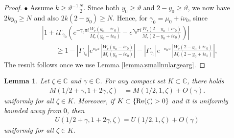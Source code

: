\documentclass[11pt,reqno]{amsproc}
\newcommand{\bullpar}[1]{\vspace{.5em}\noindent $\bullet$ \normalfont {\bfseries #1.}}
\newtheorem{lemma}[proposition]{Lemma}
\theoremstyle{definition}
\numberwithin{equation}{section}
\newcommand{\C}{{\mathbb C}}
\newcommand{\sr}{{\mathsf{r}}}
\newcommand{\ep}{\varepsilon}
\def\Re{{\rm Re}}
\begin{document}
\begin{proof}
\bullpar{Case 2} Assume $k\geq \vartheta^{-1}\frac{N}{2}$. Since both $y_0\geq \vartheta$ and $2-y_0\geq \vartheta$, we now have $2ky_0\geq N$ and also $2k(2-y_0)\geq N$. Hence, for $\gamma_0 = \mu_0 + i \nu_0$, since 
\begin{align*}
&\left| 1 + i\Gamma_{\gamma_0} \left( e^{-{\gamma_0}\pi i}\frac{W_{\sr}(y_0-i\ep_0)}{M_{\sr}(y_0-i\ep_0)} - e^{{\gamma_0} \pi i}\frac{W_{\sr}(2-y_0+i\ep_0)}{M_{\sr}(2-y_0+i\ep_0)} \right) \right| \\
&\qquad\geq 1 - |\Gamma_{\gamma_0}|e^{\nu_0\pi} \left|   \frac{W_{\sr}(y_0-i\ep_0)}{M_{\sr}(y_0-i\ep_0)}  \right| - |\Gamma_{\gamma_0}|e^{-\nu_0\pi } \left| \frac{W_{\sr}(2-y_0+i\ep_0)}{M_{\sr}(2-y_0+i\ep_0)} \right|,
\end{align*}
The result follows once we use Lemma \ref{lemma:smallnulargearg}.
\end{proof}

\begin{lemma}\label{lemma:smallgammaasymptotic}
Let $\zeta\in \C$ and $\gamma\in \C$. For any compact set $K\subset\C$, there holds
\begin{align*}
M(1/2+\gamma,1+2\gamma,\zeta) &=  M(1/2,1,\zeta) + O(\gamma).
\end{align*}
uniformly for all $\zeta\in K$. Moreover, if $K\subset \lbrace \Re(\zeta)>0 \rbrace$ and it is uniformly bounded away from $0$, then
\begin{align*}
U(1/2+\gamma,1+2\gamma,\zeta) = U(1/2,1,\zeta) + O(\gamma)
\end{align*}
uniformly for all $\zeta\in K$. 
\end{lemma}
\end{document}

